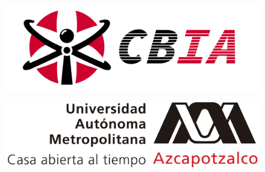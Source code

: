 
\begin{figure}[ht]
    \centering %
    \begin{minipage}{0.45\textwidth} %
        \includegraphics[width=\textwidth]{img/portada/CBI.png}
        \label{CBI}
    \end{minipage}\hfill %
    \begin{minipage}{0.45\textwidth}
        \includegraphics[width=\textwidth]{img/portada/UAM.png}
        \label{UAM}
    \end{minipage}
\end{figure}

\thispagestyle{empty} 


